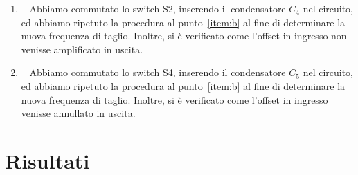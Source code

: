 \documentclass[a4paper]{article}
\begin{document}
\begin{enumerate}[label=\alph*.]
\begin{figure}[h!]
\begin{subfigure}{0.4\textwidth}
							\caption{Segnale con un offset di $ 180 \, \mathrm{mV} $.}
						\end{subfigure}
						\label{fig:punto2.4.3.d}
					\end{figure}
				\item \ 
					\newline
					Abbiamo commutato lo switch S2, inserendo il condensatore $ C_{4} $ nel circuito, ed abbiamo ripetuto la procedura al punto~\ref{item:b} al fine di determinare la nuova frequenza di taglio.
					\newline
					Inoltre, si è verificato come l'offset in ingresso non venisse amplificato in uscita.
				\item \ 
					\newline
					Abbiamo commutato lo switch S4, inserendo il condensatore $ C_{5} $ nel circuito, ed abbiamo ripetuto la procedura al punto~\ref{item:b} al fine di determinare la nuova frequenza di taglio.
					\newline
					Inoltre, si è verificato come l'offset in ingresso venisse annullato in uscita.
			\end{enumerate}
	\section{Risultati}
\end{document}

